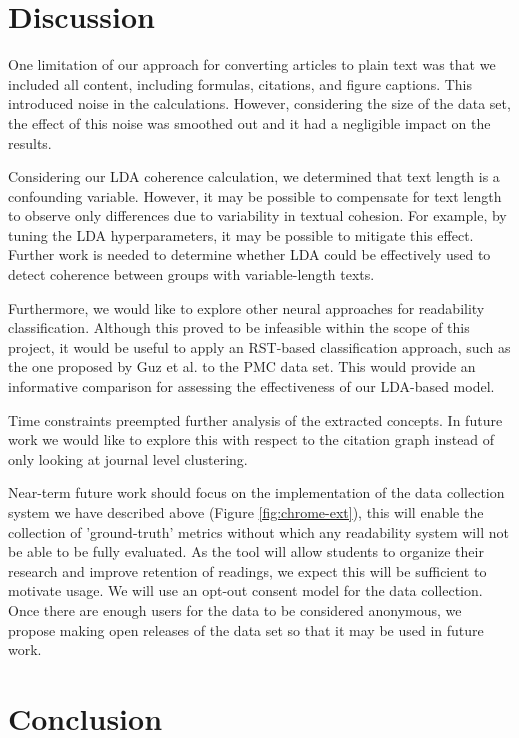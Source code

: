 \documentclass[11pt,a4paper]{article}
\begin{document}
\section{Discussion}
\label{ssec:Discussion}

One limitation of our approach for converting articles to plain text was that we included all content, including formulas, citations, and figure captions. This introduced noise in the calculations. However, considering the size of the data set, the effect of this noise was smoothed out and it had a negligible impact on the results. 

Considering our LDA coherence calculation, we determined that text length is a confounding variable. However, it may be possible to compensate for text length to observe only differences due to variability in textual cohesion. For example, by tuning the LDA hyperparameters, it may be possible to mitigate this effect. Further work is needed to determine whether LDA could be effectively used to detect coherence between groups with variable-length texts.

Furthermore, we would like to explore other neural approaches for readability classification. Although this proved to be infeasible within the scope of this project, it would be useful to apply an RST-based classification approach, such as the one proposed by Guz et al. to the PMC data set. This would provide an informative comparison for assessing the effectiveness of our LDA-based model.

Time constraints preempted further analysis of the extracted concepts. In future work we would like to explore this with respect to the citation graph instead of only looking at journal level clustering.

Near-term future work should focus on the implementation of the data collection system we have described above (Figure \ref{fig:chrome-ext}), this will enable the collection of 'ground-truth' metrics without which any readability system will not be able to be fully evaluated. As the tool will allow students to organize their research and improve retention of readings, we expect this will be sufficient to motivate usage. We will use an opt-out consent model for the data collection. Once there are enough users for the data to be considered anonymous, we propose making open releases of the data set so that it may be used in future work.


\section{Conclusion}
\label{ssec:Conclusion}
\end{document}
